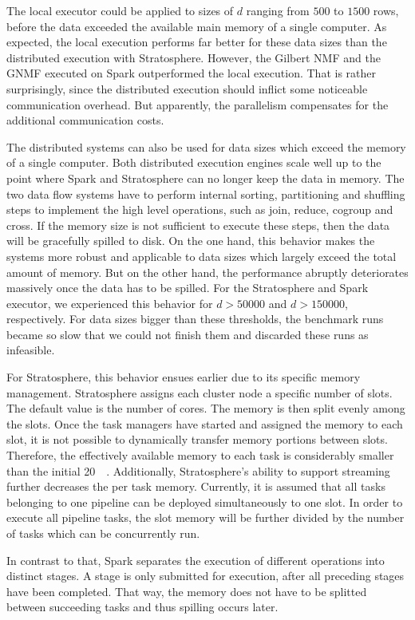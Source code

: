 The local executor could be applied to sizes of $d$ ranging from $500$ to $1500$ rows, before the data exceeded the available main memory of a single computer.
As expected, the local execution performs far better for these data sizes than the distributed execution with Stratosphere.
However, the Gilbert NMF and the GNMF executed on Spark outperformed the local execution.
That is rather surprisingly, since the distributed execution should inflict some noticeable communication overhead.
But apparently, the parallelism compensates for the additional communication costs.

The distributed systems can also be used for data sizes which exceed the memory of a single computer.
Both distributed execution engines scale well up to the point where Spark and Stratosphere can no longer keep the data in memory.
The two data flow systems have to perform internal sorting, partitioning and shuffling steps to implement the high level operations, such as join, reduce, cogroup and cross.
If the memory size is not sufficient to execute these steps, then the data will be gracefully spilled to disk.
On the one hand, this behavior makes the systems more robust and applicable to data sizes which largely exceed the total amount of memory.
But on the other hand, the performance abruptly deteriorates massively once the data has to be spilled.
For the Stratosphere and Spark executor, we experienced this behavior for $d>50000$ and $d>150000$, respectively.
For data sizes bigger than these thresholds, the benchmark runs became so slow that we could not finish them and discarded these runs as infeasible.

For Stratosphere, this behavior ensues earlier due to its specific memory management.
Stratosphere assigns each cluster node a specific number of slots.
The default value is the number of cores.
The memory is then split evenly among the slots.
Once the task managers have started and assigned the memory to each slot, it is not possible to dynamically transfer memory portions between slots.
Therefore, the effectively available memory to each task is considerably smaller than the initial \SI{20}{\giga\byte}.
Additionally, Stratosphere's ability to support streaming further decreases the per task memory.
Currently, it is assumed that all tasks belonging to one pipeline can be deployed simultaneously to one slot.
In order to execute all pipeline tasks, the slot memory will be further divided by the number of tasks which can be concurrently run.

In contrast to that, Spark separates the execution of different operations into distinct stages.
A stage is only submitted for execution, after all preceding stages have been completed.
That way, the memory does not have to be splitted between succeeding tasks and thus spilling occurs later.

